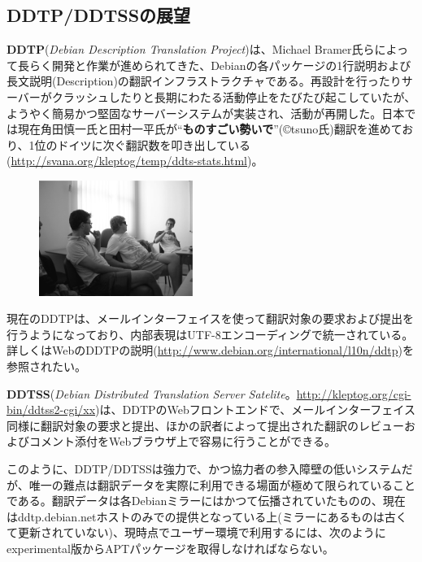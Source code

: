 \documentclass[mingoth,a4paper]{jsarticle}
\begin{document}


\subsection{DDTP/DDTSSの展望}
\label{sec:extremadura-ddtp}

\textbf{DDTP}(\emph{Debian Description Translation Project})は、Michael Bramer氏らによって長らく開発と作業が進められてきた、Debianの各パッケージの1行説明および長文説明(Description)の翻訳インフラストラクチャである。再設計を行ったりサーバーがクラッシュしたりと長期にわたる活動停止をたびたび起こしていたが、ようやく簡易かつ堅固なサーバーシステムが実装され、活動が再開した。日本では現在角田慎一氏と田村一平氏が``\textbf{ものすごい勢いで}''(\copyright tsuno氏)翻訳を進めており、1位のドイツに次ぐ翻訳数を叩き出している(\url{http://svana.org/kleptog/temp/ddts-stats.html})。

\begin{figure}\includegraphics[width=5cm]{image200610/grisu.eps}\end{figure}

現在のDDTPは、メールインターフェイスを使って翻訳対象の要求および提出を行うようになっており、内部表現はUTF-8エンコーディングで統一されている。詳しくはWebのDDTPの説明(\url{http://www.debian.org/international/l10n/ddtp})を参照されたい。

\textbf{DDTSS}(\emph{Debian Distributed Translation Server Satelite}。\url{http://kleptog.org/cgi-bin/ddtss2-cgi/xx})は、DDTPのWebフロントエンドで、メールインターフェイス同様に翻訳対象の要求と提出、ほかの訳者によって提出された翻訳のレビューおよびコメント添付をWebブラウザ上で容易に行うことができる。

このように、DDTP/DDTSSは強力で、かつ協力者の参入障壁の低いシステムだが、唯一の難点は翻訳データを実際に利用できる場面が極めて限られていることである。翻訳データは各Debianミラーにはかつて伝播されていたものの、現在はddtp.debian.netホストのみでの提供となっている上(ミラーにあるものは古くて更新されていない)、現時点でユーザー環境で利用するには、次のようにexperimental版からAPTパッケージを取得しなければならない。
\end{document}
